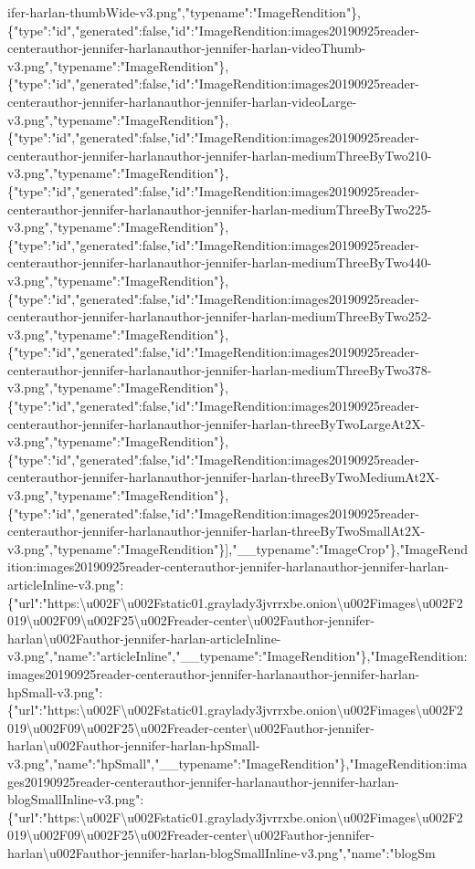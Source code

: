 ifer-harlan-thumbWide-v3.png","typename":"ImageRendition"\},\{"type":"id","generated":false,"id":"ImageRendition:images20190925reader-centerauthor-jennifer-harlanauthor-jennifer-harlan-videoThumb-v3.png","typename":"ImageRendition"\},\{"type":"id","generated":false,"id":"ImageRendition:images20190925reader-centerauthor-jennifer-harlanauthor-jennifer-harlan-videoLarge-v3.png","typename":"ImageRendition"\},\{"type":"id","generated":false,"id":"ImageRendition:images20190925reader-centerauthor-jennifer-harlanauthor-jennifer-harlan-mediumThreeByTwo210-v3.png","typename":"ImageRendition"\},\{"type":"id","generated":false,"id":"ImageRendition:images20190925reader-centerauthor-jennifer-harlanauthor-jennifer-harlan-mediumThreeByTwo225-v3.png","typename":"ImageRendition"\},\{"type":"id","generated":false,"id":"ImageRendition:images20190925reader-centerauthor-jennifer-harlanauthor-jennifer-harlan-mediumThreeByTwo440-v3.png","typename":"ImageRendition"\},\{"type":"id","generated":false,"id":"ImageRendition:images20190925reader-centerauthor-jennifer-harlanauthor-jennifer-harlan-mediumThreeByTwo252-v3.png","typename":"ImageRendition"\},\{"type":"id","generated":false,"id":"ImageRendition:images20190925reader-centerauthor-jennifer-harlanauthor-jennifer-harlan-mediumThreeByTwo378-v3.png","typename":"ImageRendition"\},\{"type":"id","generated":false,"id":"ImageRendition:images20190925reader-centerauthor-jennifer-harlanauthor-jennifer-harlan-threeByTwoLargeAt2X-v3.png","typename":"ImageRendition"\},\{"type":"id","generated":false,"id":"ImageRendition:images20190925reader-centerauthor-jennifer-harlanauthor-jennifer-harlan-threeByTwoMediumAt2X-v3.png","typename":"ImageRendition"\},\{"type":"id","generated":false,"id":"ImageRendition:images20190925reader-centerauthor-jennifer-harlanauthor-jennifer-harlan-threeByTwoSmallAt2X-v3.png","typename":"ImageRendition"\}{]},"\_\_typename":"ImageCrop"\},"ImageRendition:images20190925reader-centerauthor-jennifer-harlanauthor-jennifer-harlan-articleInline-v3.png":\{"url":"https:\textbackslash{}u002F\textbackslash{}u002Fstatic01.graylady3jvrrxbe.onion\textbackslash{}u002Fimages\textbackslash{}u002F2019\textbackslash{}u002F09\textbackslash{}u002F25\textbackslash{}u002Freader-center\textbackslash{}u002Fauthor-jennifer-harlan\textbackslash{}u002Fauthor-jennifer-harlan-articleInline-v3.png","name":"articleInline","\_\_typename":"ImageRendition"\},"ImageRendition:images20190925reader-centerauthor-jennifer-harlanauthor-jennifer-harlan-hpSmall-v3.png":\{"url":"https:\textbackslash{}u002F\textbackslash{}u002Fstatic01.graylady3jvrrxbe.onion\textbackslash{}u002Fimages\textbackslash{}u002F2019\textbackslash{}u002F09\textbackslash{}u002F25\textbackslash{}u002Freader-center\textbackslash{}u002Fauthor-jennifer-harlan\textbackslash{}u002Fauthor-jennifer-harlan-hpSmall-v3.png","name":"hpSmall","\_\_typename":"ImageRendition"\},"ImageRendition:images20190925reader-centerauthor-jennifer-harlanauthor-jennifer-harlan-blogSmallInline-v3.png":\{"url":"https:\textbackslash{}u002F\textbackslash{}u002Fstatic01.graylady3jvrrxbe.onion\textbackslash{}u002Fimages\textbackslash{}u002F2019\textbackslash{}u002F09\textbackslash{}u002F25\textbackslash{}u002Freader-center\textbackslash{}u002Fauthor-jennifer-harlan\textbackslash{}u002Fauthor-jennifer-harlan-blogSmallInline-v3.png","name":"blogSm